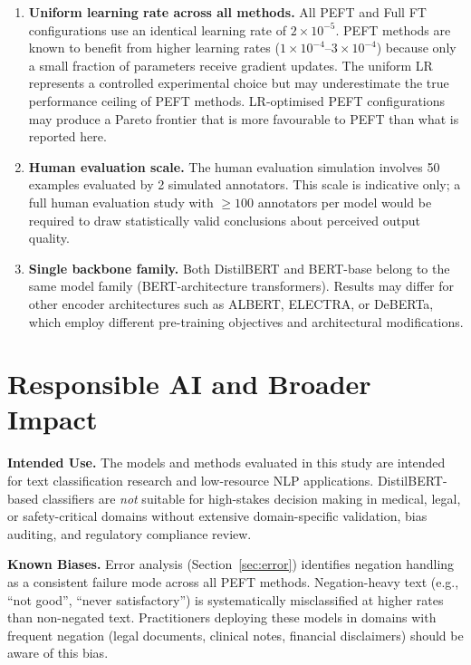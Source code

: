\documentclass[conference]{IEEEtran}
\begin{document}
\begin{enumerate}
  \item \textbf{Uniform learning rate across all methods.} All PEFT and Full FT configurations use an identical learning rate of $2{\times}10^{-5}$. PEFT methods are known to benefit from higher learning rates ($1{\times}10^{-4}$--$3{\times}10^{-4}$) because only a small fraction of parameters receive gradient updates. The uniform LR represents a controlled experimental choice but may underestimate the true performance ceiling of PEFT methods. LR-optimised PEFT configurations may produce a Pareto frontier that is more favourable to PEFT than what is reported here.

  \item \textbf{Human evaluation scale.} The human evaluation simulation involves 50 examples evaluated by 2 simulated annotators. This scale is indicative only; a full human evaluation study with ${\geq}100$ annotators per model would be required to draw statistically valid conclusions about perceived output quality.

  \item \textbf{Single backbone family.} Both DistilBERT and BERT-base belong to the same model family (BERT-architecture transformers). Results may differ for other encoder architectures such as ALBERT, ELECTRA, or DeBERTa, which employ different pre-training objectives and architectural modifications.
\end{enumerate}

\section{Responsible AI and Broader Impact}
\label{sec:responsible}

\textbf{Intended Use.} The models and methods evaluated in this study are intended for text classification research and low-resource NLP applications. DistilBERT-based classifiers are \emph{not} suitable for high-stakes decision making in medical, legal, or safety-critical domains without extensive domain-specific validation, bias auditing, and regulatory compliance review.

\textbf{Known Biases.} Error analysis (Section~\ref{sec:error}) identifies negation handling as a consistent failure mode across all PEFT methods. Negation-heavy text (e.g., ``not good'', ``never satisfactory'') is systematically misclassified at higher rates than non-negated text. Practitioners deploying these models in domains with frequent negation (legal documents, clinical notes, financial disclaimers) should be aware of this bias.
\end{document}

